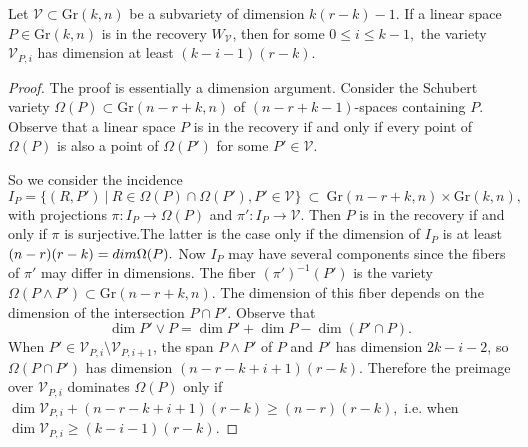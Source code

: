 \documentclass[10pt,a4paper]{amsart}
\newcommand{\Gr}{\text{Gr}}
\newcommand{\cV}{\mathcal V}
\begin{document}
\begin{thm}\label{thm:resid}
  Let $\cV\subset\Gr(k,n)$ be a subvariety of dimension $k(r-k)-1$.    If a linear space $P\in\Gr(k,n)$ is in the recovery $W_\cV$, then for some $0 \leq i \leq k-1,$ the variety $\cV_{P,i}$ has dimension at least $(k-i-1)(r-k).$
\end{thm}

\begin{proof} 
    The proof is essentially a dimension argument.  Consider the Schubert variety $\Omega(P) \subset \Gr(n-r+k,n)$ of $(n-r+k-1)$-spaces containing $P.$ Observe that a linear space $P$ is in the recovery if and only if every point of $\Omega(P)$ is also a point of $\Omega(P')$ for some $P' \in \cV.$ 
    
    So we consider the incidence
    \[
    I_P=\{(R,P') \ | \ R\in \Omega(P)\cap \Omega(P'), P'\in \cV\} \ \subset \ \Gr(n-r+k,n)\times \Gr(k,n),
    \]
    with projections $\pi:I_P\to \Omega(P)$ and $\pi':I_P\to \cV.$ Then $P$ is in the recovery if and only if $\pi$ is surjective.The latter is the case only if the dimension of $I_P$ is at least $(n-r)(r-k)={\rm dim }\Omega(P).$
   Now $I_P$ may have several components since the fibers of $\pi'$ may differ in dimensions.
   The fiber $(\pi')^{-1}(P')$ is the variety $\Omega(P\wedge P')\subset \Gr(n-r+k,n)$.
   The dimension of this fiber depends on the dimension of the intersection $P\cap P'$.  Observe that
   $$\dim P'\vee P = \dim P' + \dim P - \dim (P' \cap P).$$
   When $P'\in \cV_{P,i}\setminus \cV_{P,i+1}$, the span $P\wedge P'$ of $P$ and $P'$ has dimension $2k-i-2$, so $\Omega(P\cap P')$ has dimension $(n-r-k+i+1)(r-k)$.  Therefore the preimage over $\cV_{P,i}$ dominates $\Omega(P)$ only if
   $\dim\cV_{P,i}+ (n-r-k+i+1)(r-k)\geq (n-r)(r-k),$ i.e. when $\dim\cV_{P,i}\geq (k-i-1)(r-k)$.  

   

\end{proof}
\end{document}
